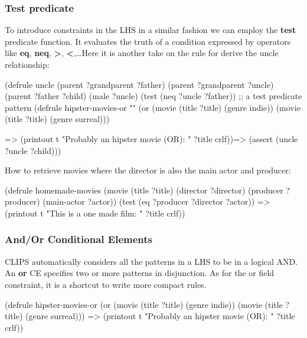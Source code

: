 \documentclass[xcolor={usenames,dvipsnames,svgnames}, compress]{beamer}
\begin{document}
\begin{frame}[fragile]
  \frametitle{Test predicate}
  To introduce constraints in the LHS in a similar fashion we can employ the \textbf{test} predicate function. It
  evaluates the truth of a condition expressed by operators like \textbf{eq}, \textbf{neq}, \textbf{>},
  \textbf{<},\dots  Here it is another take on the rule for derive the uncle
  relationship:
  \begin{clips-code}[numbers=none]
    (defrule uncle
        (parent ?grandparent ?father) (parent ?grandparent ?uncle)
        (parent ?father ?child) (male ?uncle)
        (test (neq ?uncle ?father)) ;; a test predicate pattern
        (defrule hipster-movies-or
  ""
  (or (movie (title ?title) (genre indie))
      (movie (title ?title) (genre surreal)))
  
  =>
  (printout t "Probably an hipster movie (OR): " ?title crlf))=>
        (assert (uncle ?uncle ?child)))
  \end{clips-code}

  How to retrieve movies where the director is also the main actor and producer:
  \begin{clips-code}[numbers=none]
    (defrule homemade-movies
        (movie (title ?title) 
        (director ?director) (producer ?producer) (main-actor ?actor))
        (test (eq ?producer ?director ?actor))
        =>
        (printout t "This is a one made film: " ?title crlf))
  \end{clips-code}
\end{frame}

\begin{frame}[fragile]
  \frametitle{And/Or Conditional Elements}
  CLIPS automatically considers all the patterns in a LHS to be in a
  logical AND. An \textbf{or} CE specifies two or more patterns in
  disjunction. As for the or field constraint, it is a shortcut to
  write more compact rules.
  \begin{clips-code}[numbers=none]
    (defrule hipster-movies-or
        (or (movie (title ?title) (genre indie))
        (movie (title ?title) (genre surreal)))
        =>
        (printout t "Probably an hipster movie (OR): " ?title crlf))
  \end{clips-code}
\end{frame}
\end{document}
